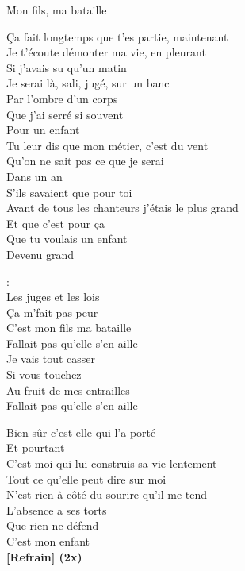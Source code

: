 \documentclass{novel}
\begin{document}
\newpage
\normalsize

\h*{Mon fils, ma bataille}

\begin{multicols}{2}
Ça fait longtemps que t'es partie, maintenant\\
Je t'écoute démonter ma vie, en pleurant\\
Si j'avais su qu'un matin\\
Je serai là, sali, jugé, sur un banc\\
Par l'ombre d'un corps\\
Que j'ai serré si souvent\\
Pour un enfant\\

Tu leur dis que mon métier, c'est du vent\\
Qu'on ne sait pas ce que je serai\\
Dans un an\\
S'ils savaient que pour toi\\
Avant de tous les chanteurs j'étais le plus grand\\
Et que c'est pour ça\\
Que tu voulais un enfant\\
Devenu grand\\

\columnbreak
\begin{bfseries}
[Refrain]:\\
Les juges et les lois\\
Ça m'fait pas peur\\
C'est mon fils ma bataille\\
Fallait pas qu'elle s'en aille\\
Je vais tout casser\\
Si vous touchez\\
Au fruit de mes entrailles\\
Fallait pas qu'elle s'en aille\\
\end{bfseries}

Bien sûr c'est elle qui l'a porté\\
Et pourtant\\
C'est moi qui lui construis sa vie lentement\\
Tout ce qu'elle peut dire sur moi\\
N'est rien à côté du sourire qu'il me tend\\
L'absence a ses torts\\
Que rien ne défend\\
C'est mon enfant\\

\textbf{[Refrain] (2x)}
\end{multicols}
\end{document}
